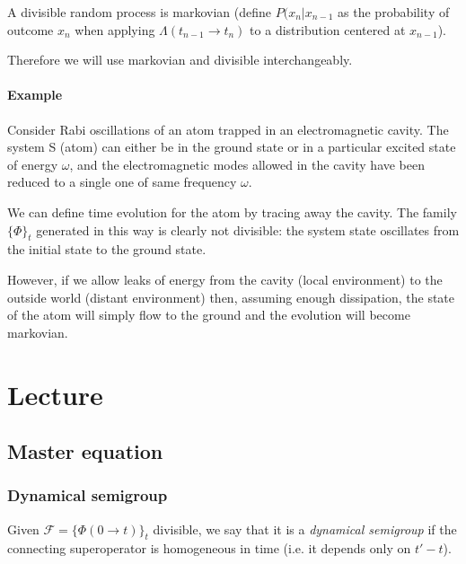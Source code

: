 \documentclass[a4paper, 11pt]{article}
\begin{document}
	A divisible random process is markovian (define $P(x_n|x_{n-1}$ as the probability of outcome $x_n$ when applying $\Lambda(t_{n-1}\rightarrow t_n)$ to a distribution centered at $x_{n-1}$).
	
	Therefore we will use markovian and divisible interchangeably.
	
	\paragraph{Example}
	Consider Rabi oscillations of an atom trapped in an electromagnetic cavity. The system S (atom) can either be in the ground state or in a particular excited state of energy $\omega$, and the electromagnetic modes allowed in the cavity have been reduced to a single one of same frequency $\omega$.
	
	\noindent We can define time evolution for the atom by tracing away the cavity. The family $\{\Phi\}_t$ generated in this way is clearly not divisible: the system state oscillates from the initial state to the ground state.
	
	However, if we allow leaks of energy from the cavity (local environment) to the outside world (distant environment) then, assuming enough dissipation, the state of the atom will simply flow to the ground and the evolution will become markovian.
	
	\section{Lecture}
	\subsection{Master equation}
	\subsubsection{Dynamical semigroup}
	Given $\mathcal{F} = \{\Phi(0\rightarrow t)\}_t$ divisible, we say that it is a \emph{dynamical semigroup} if the connecting superoperator is homogeneous in time (i.e. it depends only on $t'-t$).
	
\end{document}
